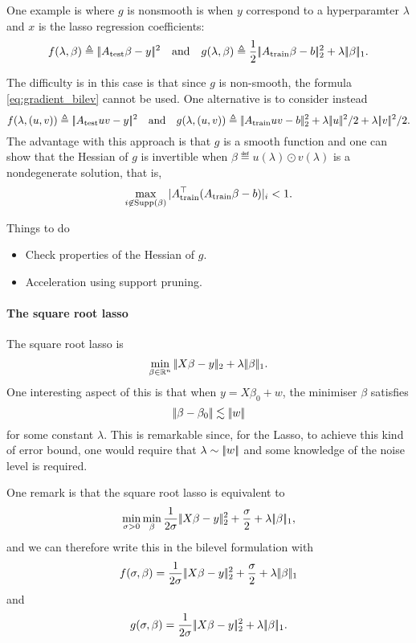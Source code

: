 \documentclass{article}
\begin{document}
One example is where $g$ is nonsmooth is when $y$ correspond to a hyperparamter $\lambda$ and $x$ is the lasso regression coefficients:  $$
f(\lambda,\beta)\triangleq |\!| A_{\text{test}}\beta - y |\!|^2\quad \text{and} \quad g(\lambda,\beta) \triangleq \frac12 |\!| A_{\text{train}}\beta - b |\!|_2^2 +\lambda |\!| \beta |\!|_1.
$$

The difficulty is in this case is that since $g$ is non-smooth, the formula \eqref{eq:gradient_bilev} cannot be used. One alternative is to consider instead
$$
f(\lambda,(u,v))\eqdef \norm{A_{\text{test}} uv - y}^2\qandq g(\lambda,(u,v)) \eqdef  \norm{A_{\text{train}}uv - b}_2^2 +\lambda \norm{u}^2/2+\lambda\norm{v}^2/2.
$$
The advantage with this approach is that $g$ is a smooth function and one can show that the Hessian of $g$ is invertible when $\beta\eqdef u(\lambda)\odot v(\lambda)$ is a nondegenerate solution, that is,
$$
\max_{i\not\in\operatorname{Supp}(\beta)} |  A_{\text{train}}^\top(A_{\text{train}}\beta - b) |_i <1.
$$

Things to do
\begin{itemize}
\item Check properties of the Hessian of $g$.
\item Acceleration using support pruning. 
\end{itemize}


\paragraph{The square root lasso}
The square root lasso is
$$
\min_{\beta \in \mathbb{R}^n} |\!| X\beta - y |\!|_2 + \lambda |\!| \beta |\!|_1.
$$
One interesting aspect of this is that when $y = X\beta_0 + w$, the minimiser $\beta$ satisfies
$$
|\!| \beta -\beta_0 |\!| \lesssim |\!| w |\!|
$$
for some constant $\lambda$. This is remarkable since, for the Lasso, to achieve this kind of error bound, one would require that $\lambda\sim |\!| w |\!|$ and some knowledge of the noise level is required.

One remark is that the square root lasso is equivalent to
$$
\min_{\sigma>0} \min_{\beta}\frac{1}{2\sigma} |\!| X\beta-y |\!|_2^2 + \frac{\sigma}{2} + \lambda |\!| \beta |\!|_1,
$$
and we can therefore write this in the bilevel formulation with
$$f(\sigma, \beta) = \frac{1}{2\sigma} |\!| X\beta-y |\!|_2^2 + \frac{\sigma}{2} + \lambda |\!| \beta |\!|_1$$
and
$$g(\sigma,\beta) = \frac{1}{2\sigma} |\!| X\beta-y |\!|_2^2 + \lambda |\!| \beta |\!|_1.$$
\end{document}
